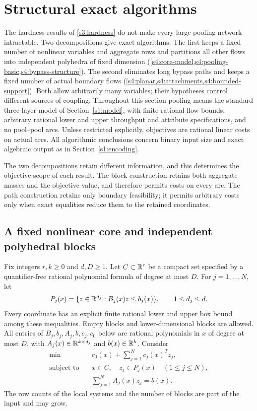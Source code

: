 \section{Structural exact algorithms}\label{s4:structural}

The hardness results of \cref{s3:hardness} do not make every large
pooling network intractable. Two decompositions give exact algorithms.
The first keeps a fixed number of nonlinear variables and aggregate
rows and partitions all other flows into independent polyhedra of fixed
dimension (\cref{s4:core-model,s4:pooling-basic,s4:bypass-structure}).
The second eliminates long bypass paths and keeps a fixed number of
actual boundary flows
(\cref{s4:planar,s4:attachments,s4:bounded-support}). Both allow
arbitrarily many variables; their hypotheses control different sources
of coupling. Throughout this section pooling means the standard three-layer model of
Section~\ref{s1:model}, with finite rational flow bounds, arbitrary
rational lower and upper throughput and attribute specifications, and
no pool--pool arcs. Unless restricted explicitly, objectives are rational
linear costs on actual arcs. All algorithmic conclusions concern binary
input size and exact algebraic output as in Section~\ref{s1:encoding}.

The two decompositions retain different information, and this
determines the objective scope of each result. The block construction
retains both aggregate masses and the objective value, and therefore
permits costs on every arc. The path construction retains only boundary
feasibility; it permits arbitrary costs only when exact equalities
reduce them to the retained coordinates.

\subsection{A fixed nonlinear core and independent polyhedral blocks}
\label{s4:core-model}

Fix integers $r,k\ge0$ and $d,D\ge1$. Let $C\subset\mathbb R^r$ be a compact
set specified by a quantifier-free rational polynomial formula of degree
at most $D$. For $j=1,\ldots,N$, let
\[
 P_j(x)=\{z\in\mathbb R^{d_j}:B_j(x)z\le b_j(x)\},\qquad 1\le d_j\le d.
\]
Every coordinate has an explicit finite rational lower and upper box
bound among these inequalities. Empty blocks and lower-dimensional
blocks are allowed. All entries of $B_j,b_j,A_j,b,c_j,c_0$ below are
rational polynomials in $x$ of degree at most $D$, with
$A_j(x)\in\mathbb R^{k\times d_j}$ and $b(x)\in\mathbb R^k$. Consider
\begin{equation}
 \begin{aligned}
 \min\quad &c_0(x)+\sum_{j=1}^N c_j(x)^Tz_j,\\
 \text{subject to}\quad &x\in C,\quad z_j\in P_j(x)\quad(1\le j\le N),\\
 &\sum_{j=1}^N A_j(x)z_j=b(x).
 \end{aligned}\label{s4:block-model}
\end{equation}
The row counts of the local systems and the number of blocks are part
of the input and may grow.

